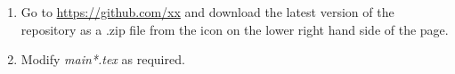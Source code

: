 \begin{enumerate}
\item Go to \href{https://github.com/xx}{https://github.com/xx} and download the latest version of the repository as a .zip file from the icon on the lower right hand side of the page.
\item Modify \emph{main*.tex} as required.
\end{enumerate}
